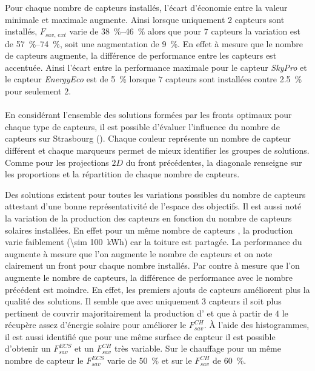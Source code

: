 Pour chaque nombre de capteurs installés, l’écart d’économie entre la valeur minimale et
maximale augmente. Ainsi lorsque uniquement $2$ capteurs sont installés, $F_{sav,\, ext}$
varie de \SIrange{38}{46}{\percent} alors que pour $7$ capteurs la variation est de
\SIrange{57}{74}{\percent}, soit une augmentation de \SI{9}{\percent}. En effet à mesure
que le nombre de capteurs augmente, la différence de performance entre les capteurs est
accentuée. Ainsi l’écart entre la performance maximale pour le capteur \textit{SkyPro} et
le capteur \textit{EnergyEco} est de \SI{5}{\percent} lorsque $7$ capteurs sont installées
contre \SI{2.5}{\percent} pour seulement $2$.

\paragraph{} %
En considérant l’ensemble des solutions formées par les fronts optimaux pour chaque
type de capteurs, il est possible d’évaluer l’influence du nombre de capteurs
sur Strasbourg (). Chaque couleur représente un
nombre de capteur différent et chaque marqueurs permet de mieux identifier les
groupes de solutions. Comme pour les projections $2D$ du front précédentes, la diagonale
renseigne sur les proportions et la répartition de chaque nombre de capteurs.

Des solutions existent pour toutes les variations possibles du nombre de capteurs attestant
d’une bonne représentativité de l’espace des objectifs. Il est aussi noté la variation
de la production des capteurs  en fonction du nombre de capteurs solaires
installées. En effet pour un même nombre de capteurs , la production varie
faiblement (\SI{\sim 100}{kWh}) car la toiture est partagée.
La performance du  augmente à mesure que l’on augmente le nombre de capteurs
et on note clairement un front pour chaque nombre installés. Par contre à mesure que
l’on augmente le nombre de capteurs, la différence de performance avec le nombre précédent
est moindre. En effet, les premiers ajouts de capteurs améliorent plus la
qualité des solutions. Il semble que avec uniquement
$3$ capteurs il soit plus pertinent de couvrir majoritairement la production d’
et que à partir de $4$ le  récupère assez d’énergie solaire pour améliorer
le $F_{sav}^{CH}$. À l’aide des histogrammes, il est aussi identifié que pour une même
surface de capteur il est possible d’obtenir un $F_{sav}^{ECS}$ et un $F_{sav}^{CH}$
très variable. Sur le chauffage pour un même nombre de capteur le $F_{sav}^{ECS}$
varie de \SI{50}{\percent} et sur le $F_{sav}^{CH}$ de \SI{60}{\percent}.

